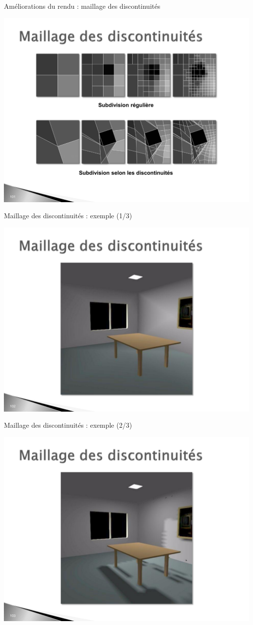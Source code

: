 \begin{frame}{Améliorations du rendu : maillage des discontinuités}
    \begin{center}
        \includegraphics[width=.9\textwidth]{figs/maillage-discontinuite.pdf}
    \end{center}
\end{frame}

\begin{frame}{Maillage des discontinuités : exemple (1/3)}
\begin{center}
    \includegraphics[width=.5\textwidth]{figs/md-1.pdf}
\end{center}    
\end{frame}

\begin{frame}{Maillage des discontinuités : exemple (2/3)}
    \begin{center}
        \includegraphics[width=.5\textwidth]{figs/md-2.pdf}
    \end{center}    
    \end{frame}

